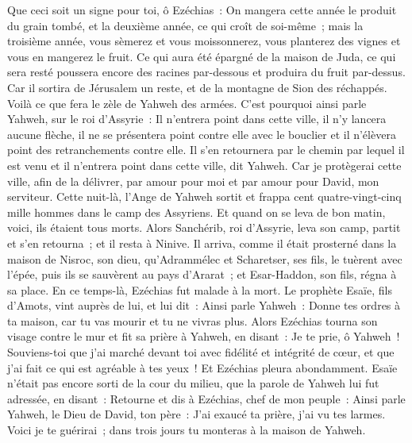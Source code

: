 \begin{multicols}{2}
Que ceci soit un signe pour toi, ô Ezéchias~: On mangera cette année le produit du grain tombé, et la deuxième année, ce qui croît de soi-même~; mais la troisième année, vous sèmerez et vous moissonnerez, vous planterez des vignes et vous en mangerez le fruit.
Ce qui aura été épargné de la maison de Juda, ce qui sera resté poussera encore des racines par-dessous et produira du fruit par-dessus.
Car il sortira de Jérusalem un reste, et de la montagne de Sion des réchappés. Voilà ce que fera le zèle de Yahweh des armées.
C'est pourquoi ainsi parle Yahweh, sur le roi d'Assyrie~: Il n'entrera point dans cette ville, il n'y lancera aucune flèche, il ne se présentera point contre elle avec le bouclier et il n'élèvera point des retranchements contre elle.
Il s'en retournera par le chemin par lequel il est venu et il n'entrera point dans cette ville, dit Yahweh.
Car je protègerai cette ville, afin de la délivrer, par amour pour moi et par amour pour David, mon serviteur.
Cette nuit-là, l'Ange de Yahweh sortit et frappa cent quatre-vingt-cinq mille hommes dans le camp des Assyriens. Et quand on se leva de bon matin, voici, ils étaient tous morts.
Alors Sanchérib, roi d'Assyrie, leva son camp, partit et s'en retourna~; et il resta à Ninive.
Il arriva, comme il était prosterné dans la maison de Nisroc, son dieu, qu'Adrammélec et Scharetser, ses fils, le tuèrent avec l'épée, puis ils se sauvèrent au pays d'Ararat~; et Esar-Haddon, son fils, régna à sa place.
\VerseOne{}En ce temps-là, Ezéchias fut malade à la mort. Le prophète Esaïe, fils d'Amots, vint auprès de lui, et lui dit~: Ainsi parle Yahweh~: Donne tes ordres à ta maison, car tu vas mourir et tu ne vivras plus.
Alors Ezéchias tourna son visage contre le mur et fit sa prière à Yahweh, en disant~:
Je te prie, ô Yahweh~! Souviens-toi que j'ai marché devant toi avec fidélité et intégrité de cœur, et que j'ai fait ce qui est agréable à tes yeux~! Et Ezéchias pleura abondamment.
Esaïe n'était pas encore sorti de la cour du milieu, que la parole de Yahweh lui fut adressée, en disant~:
Retourne et dis à Ezéchias, chef de mon peuple~: Ainsi parle Yahweh, le Dieu de David, ton père~: J'ai exaucé ta prière, j'ai vu tes larmes. Voici je te guérirai~; dans trois jours tu monteras à la maison de Yahweh.

\end{multicols}

